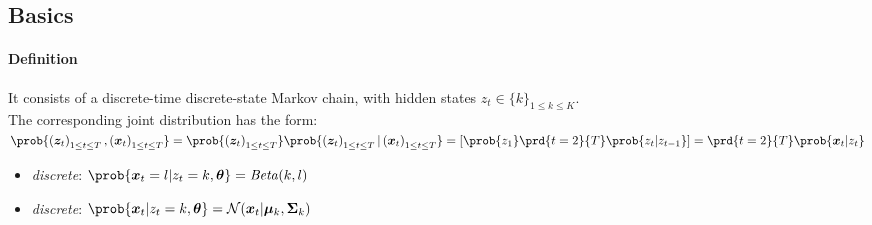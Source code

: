 \subsection{Basics}
\paragraph{Definition}
It consists of a discrete-time discrete-state Markov chain, with hidden states $z_{t}\in\{k\}_{1\leq
k\leq K}$.\\
The corresponding joint distribution has the form:
$\prob{\left(\bm{z}_{t}\right)_{1\leq t\leq T}, \left(\bm{x}_{t}\right)_{1\leq t\leq T}} = 
\prob{\left(\bm{z}_{t}\right)_{1\leq t\leq T}}
\prob{\left(\bm{z}_{t}\right)_{1\leq t\leq T}| \left(\bm{x}_{t}\right)_{1\leq t\leq T}}  =
\left[\prob{z_{1}}\prd{t=2}{T}\prob{z_{t}|z_{t-1}}\right] = \prd{t=2}{T}\prob{\bm{x}_{t}|z_{t}}$
\begin{itemize}
    \item \emph{discrete}: $\prob{\bm{x}_{t}=l|z_{t}=k,\bm{\theta}} = \text{\emph{Beta}}(k,l)$
    \item \emph{discrete}: $\prob{\bm{x}_{t}|z_{t}=k,\bm{\theta}} = \mathcal{N}(\bm{x}_{t}|
        \bm{\mu}_{k},\bm{\Sigma}_{k})$
\end{itemize}

